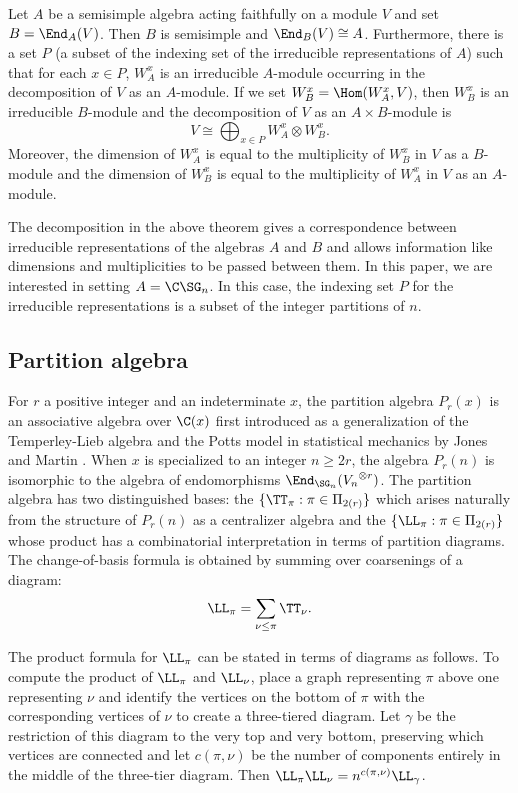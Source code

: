 \begin{theorem} Let $A$ be a semisimple algebra acting faithfully on a module $V$ and set $B=\End_A(V)$. Then $B$ is semisimple and $\End_B(V)\cong A$. Furthermore, there is a set $P$ (a subset of the indexing set of the irreducible representations of $A$) such that for each $x\in P$, $W_A^x$ is an irreducible $A$-module occurring in the decomposition of $V$ as an $A$-module. If we set $W_B^x=\Hom(W_A^x, V)$, then $W_B^x$ is an irreducible $B$-module and the decomposition of $V$ as an $A\times B$-module is \[V\cong\bigoplus_{x\in P}W_A^x\otimes W_B^x.\] Moreover, the dimension of $W_A^x$ is equal to the multiplicity of $W_B^x$ in $V$ as a $B$-module and the dimension of $W_B^x$ is equal to the multiplicity of $W_A^x$ in $V$ as an $A$-module.
\end{theorem}

The decomposition in the above theorem gives a correspondence between irreducible representations of the algebras $A$ and $B$ and allows information like dimensions and multiplicities to be passed between them. In this paper, we are interested in setting $A=\C\SG_n$. In this case, the indexing set $P$ for the irreducible representations is a subset of the integer partitions of $n$.

\subsection{Partition algebra}\label{sec:partitionalgebra}

For $r$ a positive integer and an indeterminate $x$, the partition algebra $P_r(x)$ is an associative algebra over $\C(x)$ first introduced as a generalization of the Temperley-Lieb algebra and the Potts model in statistical mechanics by Jones \cite{jones1993potts} and Martin \cite{martin, Martin1994AlgebrasIH}. When $x$ is specialized to an integer $n\geq 2r$, the algebra $P_r(n)$ is isomorphic to the algebra of endomorphisms $\End_{\SG_n}({V_n}^{\otimes r})$. The partition algebra has two distinguished bases: the  $\{\TT_\pi:\pi\in\Pi_{2(r)}\}$ which arises naturally from the structure of $P_r(n)$ as a centralizer algebra and the  $\{\LL_\pi:\pi\in\Pi_{2(r)}\}$ whose product has a combinatorial interpretation in terms of partition diagrams. The change-of-basis formula is obtained by summing over coarsenings of a diagram: \[\LL_\pi=\sum_{\nu\leq\pi}\TT_\nu.\]

The product formula for $\LL_\pi$ can be stated in terms of diagrams as follows. To compute the product of $\LL_\pi$ and $\LL_\nu$, place a graph representing $\pi$ above one representing $\nu$ and identify the vertices on the bottom of $\pi$ with the corresponding vertices of $\nu$ to create a three-tiered diagram. Let $\gamma$ be the restriction of this diagram to the very top and very bottom, preserving which vertices are connected and let $c(\pi,\nu)$ be the number of components entirely in the middle of the three-tier diagram. Then $\LL_\pi\LL_\nu=n^{c(\pi,\nu)}\LL_\gamma$.

